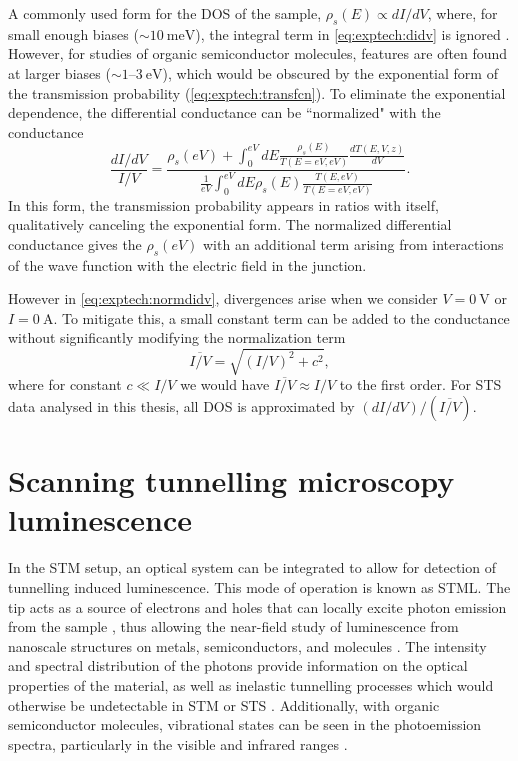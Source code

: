 A commonly used form for the \ac{DOS} of the sample, $\rho_s(E) \propto dI/dV $, where, for small enough biases ($\sim \SI{10}{\milli\electronvolt}$), the integral term in \autoref{eq:exptech:didv} is ignored \citep{feenstra1993methods}. However, for studies of organic semiconductor molecules, features are often found at larger biases ($\sim 1$--$\SI{3}{\electronvolt}$), which would be obscured by the exponential form of the transmission probability (\autoref{eq:exptech:transfcn}). To eliminate the exponential dependence, the differential conductance can be ``normalized" with the conductance  \citep{feenstra1987atom}
\begin{equation} \label{eq:exptech:normdidv}
\frac{dI/dV}{I/V} = \frac{\rho_s(eV) + \int_0 ^{eV} dE \frac{\rho_s(E)}{T(E=eV,eV)} \frac{dT(E,V,z)}{dV}}{ \frac{1}{eV} \int_0^{eV} dE \rho_s(E) \frac{T(E,eV)}{T(E=eV,eV)}}.
\end{equation}
In this form, the transmission probability appears in ratios with itself, qualitatively canceling the exponential form. The normalized differential conductance gives the $\rho_s(eV)$ with an additional term arising from interactions of the wave function with the electric field in the junction.

However in \autoref{eq:exptech:normdidv}, divergences arise when we consider $V=\SI{0}{\volt}$ or $I= \SI{0}{\ampere}$. To mitigate this, a small constant term can be added to the conductance without significantly modifying the normalization term \citep{prietsch1991structural}
\begin{equation}
    \overline{I/V} = \sqrt{(I/V)^2 + c^2},
\end{equation}
where for constant $c\ll I/V$ we would have $\overline{I/V} \approx I/V$ to the first order. For \ac{STS} data analysed in this thesis, all \ac{DOS} is approximated by $ (dI/dV) / (\overline{I/V})$.

\section{Scanning tunnelling microscopy luminescence}

In the \ac{STM} setup, an optical system can be integrated to allow for detection of tunnelling induced luminescence. This mode of operation is known as \acf{STML}. The tip acts as a source of electrons and holes that can locally excite photon emission from the sample \citep{gimzewski1988photon}, thus allowing the near-field study of luminescence from nanoscale structures on metals, semiconductors, and molecules \citep{Qiu2003}. The intensity and spectral distribution of the photons provide information on the optical properties of the material, as well as inelastic tunnelling processes which would otherwise be undetectable in \ac{STM} or \ac{STS} \citep{novotny2012principles}. Additionally, with organic semiconductor molecules, vibrational states can be seen in the photoemission spectra, particularly in the visible and infrared ranges \citep{Qiu2003,Wu2008}.

